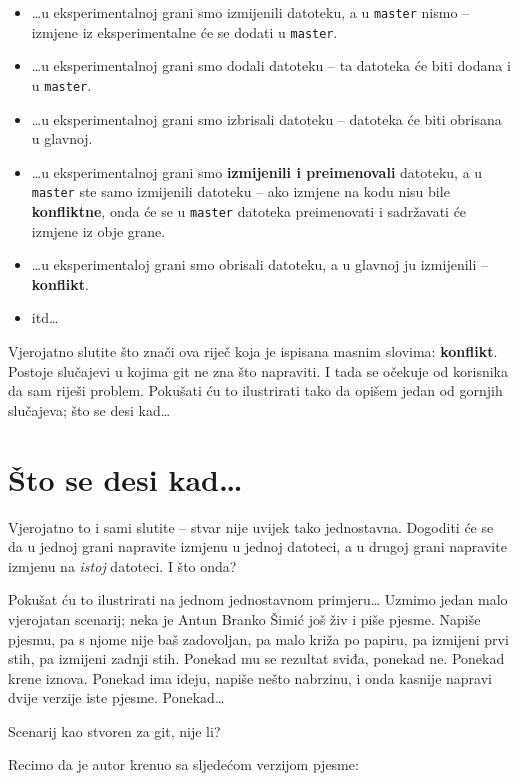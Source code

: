 \begin{itemize}
	\item \dots{}u eksperimentalnoj grani smo izmijenili datoteku, a u \verb+master+ nismo -- izmjene iz eksperimentalne će se dodati u \verb+master+.
	\item \dots{}u eksperimentalnoj grani smo dodali datoteku -- ta datoteka će biti dodana i u \verb+master+.
	\item \dots{}u eksperimentalnoj grani smo izbrisali datoteku -- datoteka će biti obrisana u glavnoj.
	\item \dots{}u eksperimentalnoj grani smo \textbf{izmijenili i preimenovali} datoteku, a u \verb+master+ ste samo izmijenili datoteku -- ako izmjene na kodu nisu bile \textbf{konfliktne}, onda će se u \verb+master+ datoteka preimenovati i sadržavati će izmjene iz obje grane.
	\item \dots{}u eksperimentaloj grani smo obrisali datoteku, a u glavnoj ju izmijenili -- \textbf{konflikt}.
	\item itd\dots
\end{itemize}

Vjerojatno slutite što znači ova riječ koja je ispisana masnim slovima: \textbf{konflikt}.
Postoje slučajevi u kojima git ne zna što napraviti. 
I tada se očekuje od korisnika da sam riješi problem. 
Pokušati ću to ilustrirati tako da opišem jedan od gornjih slučajeva; što se desi kad\dots

\section*{Što se desi kad\dots}

Vjerojatno to i sami slutite -- stvar nije uvijek tako jednostavna.
Dogoditi će se da u jednoj grani napravite izmjenu u jednoj datoteci, a u drugoj grani napravite izmjenu na \emph{istoj} datoteci.
I što onda?

Pokušat ću to ilustrirati na jednom jednostavnom primjeru\dots
Uzmimo jedan malo vjerojatan scenarij; neka je Antun Branko Šimić još živ i piše pjesme.
Napiše pjesmu, pa s njome nije baš zadovoljan, pa malo križa po papiru, pa izmijeni prvi stih, pa izmijeni zadnji stih.
Ponekad mu se rezultat sviđa, ponekad ne.
Ponekad krene iznova.
Ponekad ima ideju, napiše nešto nabrzinu, i onda kasnije napravi dvije verzije iste pjesme.
Ponekad\dots

Scenarij kao stvoren za git, nije li?

Recimo da je autor krenuo sa sljedećom verzijom pjesme:

